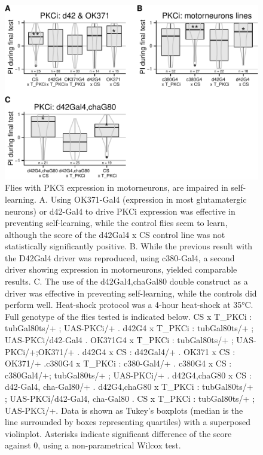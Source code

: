 \documentclass[]{article}
\begin{document}
\begin{figure}[htbp]
\centering
\includegraphics{firsttest_files/figure-latex/unnamed-chunk-4-1.pdf}
\caption{\label{fig:motoneurons} Flies with PKCi expression in
motorneurons, are impaired in self-learning. A. Using OK371-Gal4
(expression in most glutamatergic neurons) or d42-Gal4 to drive PKCi
expression was effective in preventing self-learning, while the control
flies seem to learn, although the score of the d42Gal4 x CS control line
was not statistically significantly positive. B. While the previous
result with the D42Gal4 driver was reproduced, using c380-Gal4, a second
driver showing expression in motorneurons, yielded comparable results.
C. The use of the d42Gal4,chaGal80 double construct as a driver was
effective in preventing self-learning, while the controls did perform
well. Heat-shock protocol was a 4-hour heat-shock at 35°C. Full genotype
of the flies tested is indicated below. CS x T\_PKCi : tubGal80ts/+ ;
UAS-PKCi/+ . d42G4 x T\_PKCi : tubGal80ts/+ ; UAS-PKCi/d42-Gal4 .
OK371G4 x T\_PKCi : tubGal80ts/+ ; UAS-PKCi/+;OK371/+ . d42G4 x CS :
d42Gal4/+ . OK371 x CS : OK371/+ .c380G4 x T\_PKCi : c380-Gal4/+ .
c380G4 x CS : c380Gal4/+; tubGal80ts/+ ; UAS-PKCi/+ . d42G4,chaG80 x CS
: d42-Gal4, cha-Gal80/+ . d42G4,chaG80 x T\_PKCi : tubGal80ts/+ ;
UAS-PKCi/d42-Gal4, cha-Gal80 . CS x T\_PKCi : tubGal80ts/+ ; UAS-PKCi/+.
Data is shown as Tukey's boxplots (median is the line surrounded by
boxes representing quartiles) with a superposed violinplot. Asterisks
indicate significant difference of the score against 0, using a
non-parametrical Wilcox test.}
\end{figure}
\end{document}
